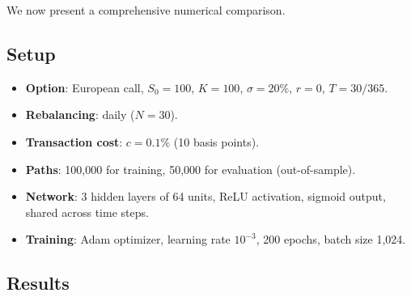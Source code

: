 \documentclass[11pt, a4paper]{article}
\theoremstyle{definition}
\theoremstyle{plain}
\theoremstyle{remark}
\begin{document}
We now present a comprehensive numerical comparison.

\subsection{Setup}

\begin{itemize}
    \item \textbf{Option}: European call, $S_0 = 100$, $K = 100$, $\sigma = 20\%$,
          $r = 0$, $T = 30/365$.
    \item \textbf{Rebalancing}: daily ($N = 30$).
    \item \textbf{Transaction cost}: $c = 0.1\%$ (10 basis points).
    \item \textbf{Paths}: 100{,}000 for training, 50{,}000 for evaluation (out-of-sample).
    \item \textbf{Network}: 3 hidden layers of 64 units, ReLU activation,
          sigmoid output, shared across time steps.
    \item \textbf{Training}: Adam optimizer, learning rate $10^{-3}$, 200 epochs, batch size 1{,}024.
\end{itemize}

\subsection{Results}
\end{document}
